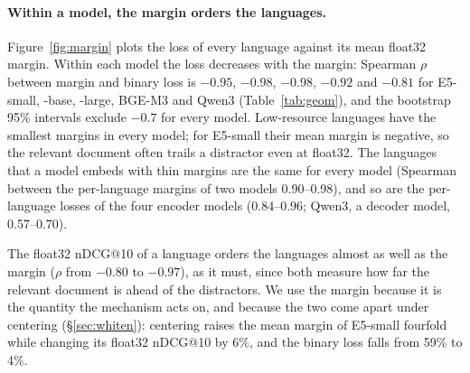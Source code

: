 \documentclass[11pt]{article}
\begin{document}
\paragraph{Within a model, the margin orders the languages.} Figure~\ref{fig:margin} plots the loss of every language against its mean float32 margin. Within each model the loss decreases with the margin: Spearman $\rho$ between margin and binary loss is $-0.95$, $-0.98$, $-0.98$, $-0.92$ and $-0.81$ for E5-small, -base, -large, BGE-M3 and Qwen3 (Table~\ref{tab:geom}), and the bootstrap 95\% intervals exclude $-0.7$ for every model. Low-resource languages have the smallest margins in every model; for E5-small their mean margin is negative, so the relevant document often trails a distractor even at float32. The languages that a model embeds with thin margins are the same for every model (Spearman between the per-language margins of two models 0.90--0.98), and so are the per-language losses of the four encoder models (0.84--0.96; Qwen3, a decoder model, 0.57--0.70).

The float32 nDCG@10 of a language orders the languages almost as well as the margin ($\rho$ from $-0.80$ to $-0.97$), as it must, since both measure how far the relevant document is ahead of the distractors. We use the margin because it is the quantity the mechanism acts on, and because the two come apart under centering (\S\ref{sec:whiten}): centering raises the mean margin of E5-small fourfold while changing its float32 nDCG@10 by 6\%, and the binary loss falls from 59\% to 4\%.
\end{document}
